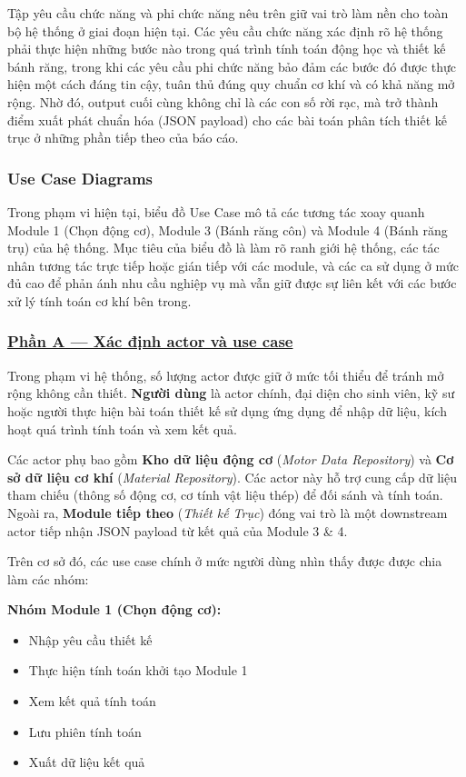\documentclass[a4paper]{article}
\begin{document}
Tập yêu cầu chức năng và phi chức năng nêu trên giữ vai trò làm nền cho toàn bộ hệ thống ở giai đoạn hiện tại. Các yêu cầu chức năng xác định rõ hệ thống phải thực hiện những bước nào trong quá trình tính toán động học và thiết kế bánh răng, trong khi các yêu cầu phi chức năng bảo đảm các bước đó được thực hiện một cách đáng tin cậy, tuân thủ đúng quy chuẩn cơ khí và có khả năng mở rộng. Nhờ đó, output cuối cùng không chỉ là các con số rời rạc, mà trở thành điểm xuất phát chuẩn hóa (JSON payload) cho các bài toán phân tích thiết kế trục ở những phần tiếp theo của báo cáo.

\subsubsection{Use Case Diagrams}
Trong phạm vi hiện tại, biểu đồ Use Case mô tả các tương tác xoay quanh Module 1 (Chọn động cơ), Module 3 (Bánh răng côn) và Module 4 (Bánh răng trụ) của hệ thống. Mục tiêu của biểu đồ là làm rõ ranh giới hệ thống, các tác nhân tương tác trực tiếp hoặc gián tiếp với các module, và các ca sử dụng ở mức đủ cao để phản ánh nhu cầu nghiệp vụ mà vẫn giữ được sự liên kết với các bước xử lý tính toán cơ khí bên trong.

\subsubsection*{\uline{Phần A --- Xác định actor và use case}}

Trong phạm vi hệ thống, số lượng actor được giữ ở mức tối thiểu để tránh mở rộng không cần thiết.
\textbf{Người dùng} là actor chính, đại diện cho sinh viên, kỹ sư hoặc người thực hiện bài toán thiết kế sử dụng ứng dụng để nhập dữ liệu, kích hoạt quá trình tính toán và xem kết quả.

Các actor phụ bao gồm \textbf{Kho dữ liệu động cơ} (\textit{Motor Data Repository}) và \textbf{Cơ sở dữ liệu cơ khí} (\textit{Material Repository}). Các actor này hỗ trợ cung cấp dữ liệu tham chiếu (thông số động cơ, cơ tính vật liệu thép) để đối sánh và tính toán. Ngoài ra, \textbf{Module tiếp theo} (\textit{Thiết kế Trục}) đóng vai trò là một downstream actor tiếp nhận JSON payload từ kết quả của Module 3 \& 4.

Trên cơ sở đó, các use case chính ở mức người dùng nhìn thấy được được chia làm các nhóm:

\textbf{Nhóm Module 1 (Chọn động cơ):}
\begin{itemize}
\item Nhập yêu cầu thiết kế
\item Thực hiện tính toán khởi tạo Module 1
\item Xem kết quả tính toán
\item Lưu phiên tính toán
\item Xuất dữ liệu kết quả
\end{itemize}
\end{document}
